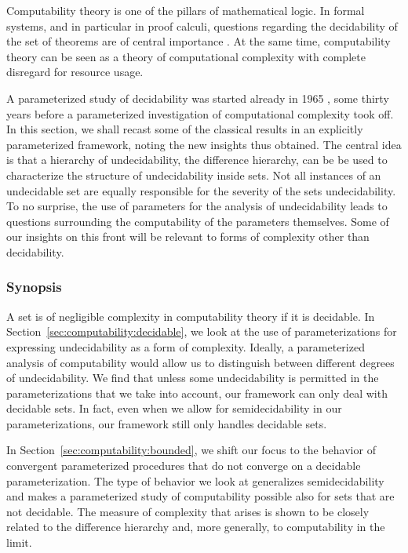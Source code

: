 \label{sec:computability}%

Computability theory \parencite{rogers1967theory} is one of the pillars of mathematical logic.
In formal systems, and in particular in proof calculi, questions regarding the decidability of the set of theorems are of central importance \parencite{kleene1967mathematical,troelstra2000basic}.
At the same time, computability theory can be seen as a theory of computational complexity with complete disregard for resource usage.

A parameterized study of decidability was started already in 1965 \parencite{putnam1965trial,gold1965limiting}, some thirty years before a parameterized investigation of computational complexity took off.
In this section, we shall recast some of the classical results in an explicitly parameterized framework, noting the new insights thus obtained.
The central idea is that a hierarchy of undecidability, the difference hierarchy, can be be used to characterize the structure of undecidability inside sets.
Not all instances of an undecidable set are equally responsible for the severity of the sets undecidability.
To no surprise, the use of parameters for the analysis of undecidability leads to questions surrounding the computability of the parameters themselves.
Some of our insights on this front will be relevant to forms of complexity other than decidability.

\subsubsection{Synopsis}
A set is of negligible complexity in computability theory if it is decidable.
In Section~\ref{sec:computability:decidable}, we look at the use of parameterizations for expressing undecidability as a form of complexity.
Ideally, a parameterized analysis of computability would allow us to distinguish between different degrees of undecidability.
We find that unless some undecidability is permitted in the parameterizations that we take into account, our framework can only deal with decidable sets.
In fact, even when we allow for semidecidability in our parameterizations, our framework still only handles decidable sets.

In Section~\ref{sec:computability:bounded}, we shift our focus to the behavior of convergent parameterized procedures that do not converge on a decidable parameterization.
The type of behavior we look at generalizes semidecidability and makes a parameterized study of computability possible also for sets that are not decidable.
The measure of complexity that arises is shown to be closely related to the difference hierarchy and, more generally, to computability in the limit.

